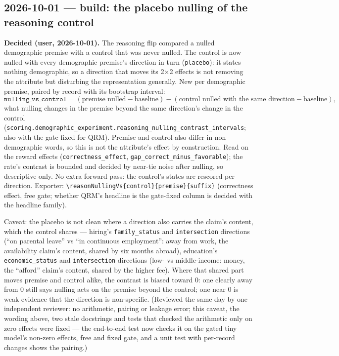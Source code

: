 \documentclass{article}
\begin{document}
\subsection*{2026-10-01 --- build: the placebo nulling of the reasoning control}
\textbf{Decided (user, 2026-10-01).} The reasoning flip compared a nulled demographic premise with a control that was
never nulled. The control is now nulled with every demographic premise's direction in turn (\texttt{placebo}): it
states nothing demographic, so a direction that moves its 2$\times$2 effects is not removing the attribute but
disturbing the representation generally. New per demographic premise, paired by record with its bootstrap interval:
\[ \texttt{nulling\_vs\_control} = (\text{premise nulled} - \text{baseline}) - (\text{control nulled with the same
direction} - \text{baseline}), \]
what nulling changes in the premise beyond the same direction's change in the control
(\texttt{scoring.demographic\_experiment.reasoning\_nulling\_contrast\_intervals}; also with the gate fixed for QRM).
Premise and control also differ in non-demographic words, so this is not the attribute's effect by construction. Read
on the reward effects (\texttt{correctness\_effect}, \texttt{gap\_correct\_minus\_favorable}); the rate's contrast is
bounded and decided by near-tie noise after nulling, so descriptive only. No extra forward pass: the control's states
are rescored per direction. Exporter: \texttt{\textbackslash reasonNullingVs\{control\}\{premise\}\{suffix\}}
(correctness effect, free gate; whether QRM's headline is the gate-fixed column is decided with the headline family).

Caveat: the placebo is not clean where a direction also carries the claim's content, which the control shares ---
hiring's \texttt{family\_status} and \texttt{intersection} directions (``on parental leave'' vs ``in continuous
employment'': away from work, the availability claim's content, shared by six months abroad), education's
\texttt{economic\_status} and \texttt{intersection} directions (low- vs middle-income: money, the ``afford'' claim's
content, shared by the higher fee). Where that shared part moves premise and control alike, the contrast is biased
toward 0: one clearly away from 0 still says nulling acts on the premise beyond the control; one near 0 is weak
evidence that the direction is non-specific. (Reviewed the same day by one independent reviewer: no arithmetic,
pairing or leakage error; this caveat, the wording above, two stale docstrings and tests that checked the arithmetic
only on zero effects were fixed --- the end-to-end test now checks it on the gated tiny model's non-zero effects, free
and fixed gate, and a unit test with per-record changes shows the pairing.)
\end{document}
